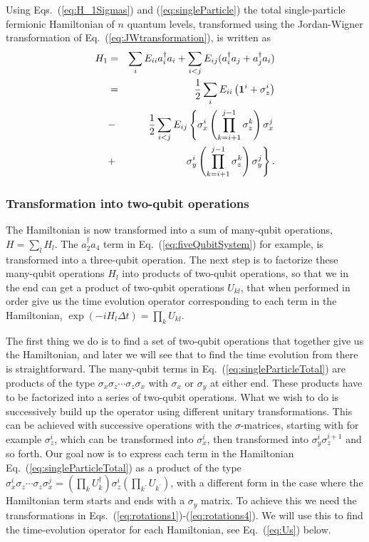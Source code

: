 \documentclass[aps,pra,twocolumn,floatfix]{revtex4}
\begin{document}
Using Eqs.~(\ref{eq:H_1Sigmas}) and (\ref{eq:singleParticle})
the total single-particle fermionic Hamiltonian of $n$ quantum levels,
transformed using the Jordan-Wigner transformation of
Eq.~(\ref{eq:JWtransformation}), is written as
\begin{eqnarray}
\label{eq:singleParticleTotal}
H_1 &=& \sum_{i} E_{ii} a^\dag_i a_i +
\sum_{i<j} E_{ij} (a^\dag_i a_j + a^\dag_j a_i) \notag\\
&=&
 \frac{1}{2}\sum_{i} E_{ii}\left({\bf 1}^i + \sigma_z^i\right)
\notag\\
&-& \frac{1}{2}\sum_{i<j} E_{ij} 
  \left\{ 
\sigma_x^i \left(\prod_{k=i+1}^{j-1}\sigma_z^k \right)\sigma_x^j \right.\notag\\
&+& \left.\sigma_y^i \left(\prod_{k=i+1}^{j-1}\sigma_z^k \right)\sigma_y^j
\right\}.
\end{eqnarray}


\subsubsection{Transformation into two-qubit operations}
The Hamiltonian is now transformed into a sum of many-qubit
operations, $H=\sum_l H_l$. The $a_2^\dag a_4$ term in Eq.~(\ref{eq:fiveQubitSystem})
for example, is transformed into a three-qubit operation. The next
step is to factorize these many-qubit operations $H_l$ into products of
two-qubit operations, so that we in the end can get a product of
two-qubit operations $U_{kl}$, that when performed in order give us the time
evolution operator corresponding to each term in the Hamiltonian, 
$\exp(-iH_l\Delta t) = \prod_k U_{kl}$.


The first thing we do is to find a set of two-qubit operations that
together give us the Hamiltonian, and later  we will see that to
find the time evolution from there is straightforward. 
The many-qubit terms in Eq.~(\ref{eq:singleParticleTotal}) are 
products of the type $\sigma_x \sigma_z \cdots \sigma_z \sigma_x$
with $\sigma_x$ or $\sigma_y$ at either end. These products have to be
factorized into a series of two-qubit operations.
What we wish to do is successively build up the operator using
different unitary transformations. 
This can be achieved with successive operations with the $\sigma$-matrices, starting with for example
$\sigma_z^i$, which can be transformed 
into $\sigma_x^i$, then transformed into $\sigma_y^i\sigma_z^{i+1}$
and so forth.
Our goal now is to express each term in the Hamiltonian
Eq.~(\ref{eq:singleParticleTotal}) as a product of the type
$\sigma_x^i \sigma_z \cdots \sigma_z 
\sigma_x^j=
(\prod_k U_k^\dag ) \sigma_z^i 
(\prod_{k^\prime} U_{k^\prime})$, with a different form in the case
where the Hamiltonian term starts and ends with a $\sigma_y$ matrix.
To achieve this we need the transformations in
Eqs.~(\ref{eq:rotations1})-(\ref{eq:rotations4}). 
We will use this to find the time-evolution operator for each Hamiltonian, see
Eq.~(\ref{eq:Us}) below. 
\end{document}
